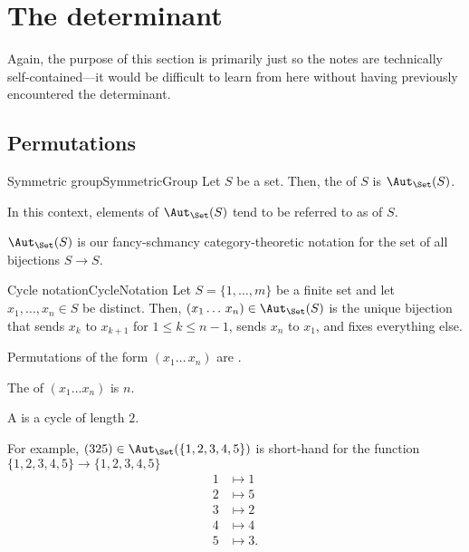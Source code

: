 \section{The determinant}

Again, the purpose of this section is primarily just so the notes are technically self-contained---it would be difficult to learn from here without having previously encountered the determinant.

\subsection{Permutations}

\begin{dfn}{Symmetric group}{SymmetricGroup}
	Let $S$ be a set.  Then, the  of $S$ is $\Aut _{\Set}(S)$.
	\begin{rmk}
		In this context, elements of $\Aut _{\Set}(S)$ tend to be referred to as  of $S$.
	\end{rmk}
	\begin{rmk}
		$\Aut _{\Set}(S)$ is our fancy-schmancy category-theoretic notation for the set of all bijections $S\rightarrow S$.
	\end{rmk}
\end{dfn}
\begin{dfn}{Cycle notation}{CycleNotation}
	Let $S=\{ 1,\ldots ,m\}$ be a finite set and let $x_1,\ldots ,x_n\in S$ be distinct.  Then, $(x_1\ldots \, x_n)\in \Aut _{\Set}(S)$ is the unique bijection that sends $x_k$ to $x_{k+1}$ for $1\leq k\leq n-1$, sends $x_n$ to $x_1$, and fixes everything else.
	\begin{rmk}
		Permutations of the form $(x_1\ldots \, x_n)$ are \index{Cycle}.
	\end{rmk}
	\begin{rmk}
		The  of $(x_1\ldots x_n)$ is $n$.
	\end{rmk}
	\begin{rmk}
		A  is a cycle of length $2$.
	\end{rmk}
	\begin{rmk}
		For example, $(325)\in \Aut _{\Set}(\{ 1,2,3,4,5\} )$ is short-hand for the function $\{ 1,2,3,4,5\} \rightarrow \{ 1,2,3,4,5\}$
		\begin{subequations}
			\begin{align}
			1 & \mapsto 1 \\
			2 & \mapsto 5 \\
			3 & \mapsto 2 \\
			4 & \mapsto 4 \\
			5 & \mapsto 3.
			\end{align}
		\end{subequations}
	\end{rmk}
\end{dfn}
